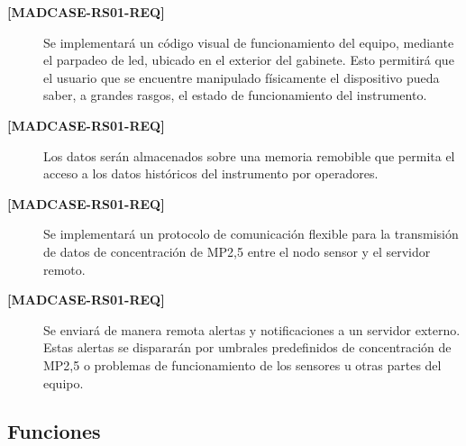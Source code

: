 \documentclass[
11pt, %
codirector, %
]{charter}
\makeatletter
\newcommand{\mytwodigits}[1]{\two@digits{#1}}
\newcounter{reqCounter}
\makeatother
\begin{document}
\begin{description}
	\item[\textbf{[MADCASE-RS01-REQ\mytwodigits{\value{reqCounter}}]}] Se implementará un código visual de funcionamiento del equipo, mediante el parpadeo de led, ubicado en el exterior del gabinete. Esto permitirá que el usuario que se encuentre manipulado físicamente el dispositivo pueda saber, a grandes rasgos, el estado de funcionamiento del instrumento.
	
	\item[\textbf{[MADCASE-RS01-REQ\mytwodigits{\value{reqCounter}}]}] Los datos serán almacenados sobre una memoria remobible que permita el  acceso a los datos históricos del instrumento por operadores.
	
	\item[\textbf{[MADCASE-RS01-REQ\mytwodigits{\value{reqCounter}}]}] Se implementará un protocolo de comunicación flexible para la transmisión de datos de concentración de MP2,5 entre el nodo sensor y el servidor remoto.

	\item[\textbf{[MADCASE-RS01-REQ\mytwodigits{\value{reqCounter}}]}] Se enviará de manera remota  alertas y notificaciones a un servidor externo. Estas alertas se dispararán por umbrales predefinidos de concentración de MP2,5 o problemas de funcionamiento de los sensores u otras partes del equipo.


\end{description}



\subsection{Funciones}
\label{sec:org307bb59}

%
\end{document}
